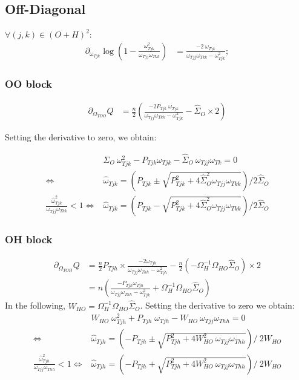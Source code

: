\documentclass[11pt,a4paper]{article}
\begin{document}
\subsection{Off-Diagonal}
$ \forall (j,k) \in (O+H)^2$:
\begin{align*}
\partial_{\omega_{Tjk}}\log\left(1-\frac{\omega_{Tjk}^2}{\omega_{Tjj}\omega_{Tkk}}\right) &= \frac{-2 \: \omega_{Tjk}}{\omega_{Tjj} \omega_{Tkk} -\omega_{Tjk}^2};
\end{align*}
\subsubsection{OO block}
\begin{align*}
\partial_{\Omega_{TOO
}}Q &= \frac{n}{2}\left( \frac{-2P_{Tjk} \:\omega_{Tjk}}{\omega_{Tjj}\omega_{Tkk}-\omega_{Tjk}^2} -  \widehat{\Sigma}_O \times 2\right)
\end{align*}

Setting the derivative to zero, we obtain:

\begin{align*}
& \widehat{\Sigma}_O \:\omega_{Tjk}^2 - P_{Tjk} \omega_{Tjk} -  \widehat{\Sigma}_O \: \omega_{Tjj}\omega_{Tk} =0\\
\iff & \hat{\omega}_{Tjk} = \left(P_{Tjk} \pm \sqrt{P_{Tjk}^2 + 4\widehat{\Sigma}_O^2 \omega_{Tjj}\omega_{Tkk}}\right) /2 \widehat{\Sigma}_O\\
\frac{\hat{\omega}_{Tjk}^2}{\omega_{Tjj}\omega_{Tkk}}< 1 \iff &  \hat{\omega}_{Tjk} = \left(P_{Tjk} - \sqrt{P_{Tjk}^2 + 4\widehat{\Sigma}_O^2 \omega_{Tjj}\omega_{Tkk}}\right) /2 \widehat{\Sigma}_O
\end{align*}

\subsubsection{OH block}
\begin{align*}
\partial_{\Omega_{TOH}}Q &= \frac{n}{2}P_{Tjh}\times \frac{-2\omega_{Tjh}}{\omega_{Tjj}\omega_{Thh}-\omega_{Tjh}^2} - \frac{n}{2} (-\Omega_H^{-1} \Omega_{HO} \widehat{\Sigma}_O) \times 2\\
&=n\left(\frac{-P_{Tjh} \omega_{Tjh}}{\omega_{Tjj}\omega_{Thh}-\omega_{Tjk}^2} + \Omega_H^{-1} \Omega_{HO} \widehat{\Sigma}_O \right)
\end{align*}
In the following, $W_{HO} =\Omega_H^{-1} \Omega_{HO} \widehat{\Sigma}_O $. Setting the derivative to zero we obtain:
\begin{align*}
&W_{HO} \; \omega_{Tjh}^2 + P_{Tjh} \; \omega_{Tjh} - W_{HO} \:\omega_{Tjj}\omega_{Thh} = 0\\
\iff& \hat{\omega}_{Tjh} = \left( -P_{Tjh} \pm \sqrt{P_{Tjh}^2 + 4W_{HO}^2\:\omega_{Tjj}\omega_{Thh}}\right) / \: 2W_{HO} \\
\frac{ \hat{\omega}_{Tjh}^2}{\omega_{Tjj}\omega_{Thh}} < 1 \iff &  \hat{\omega}_{Tjh} = \left( -P_{Tjh} + \sqrt{P_{Tjh}^2 + 4W_{HO}^2\:\omega_{Tjj}\omega_{Thh}}\right) / \: 2W_{HO} 
\end{align*}
\end{document}
